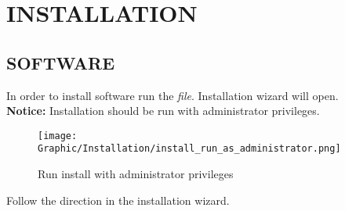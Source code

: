 \chapter{INSTALLATION}
\thispagestyle{fancy}

\section {SOFTWARE}

In order to install software run the \textit{ \SetupFileName file}. Installation
wizard will open. \\

\textbf{Notice:} Installation should be run with administrator privileges.

	\begin{figure}[!h] 
	\centering \texttt{[image: Graphic/Installation/install\_run\_as\_administrator.png]}	
	\caption{Run install with administrator privileges}
	\label{run_install_with_administrator_privileges}
	\end{figure}
	\FloatBarrier

Follow the direction in the installation wizard.  

